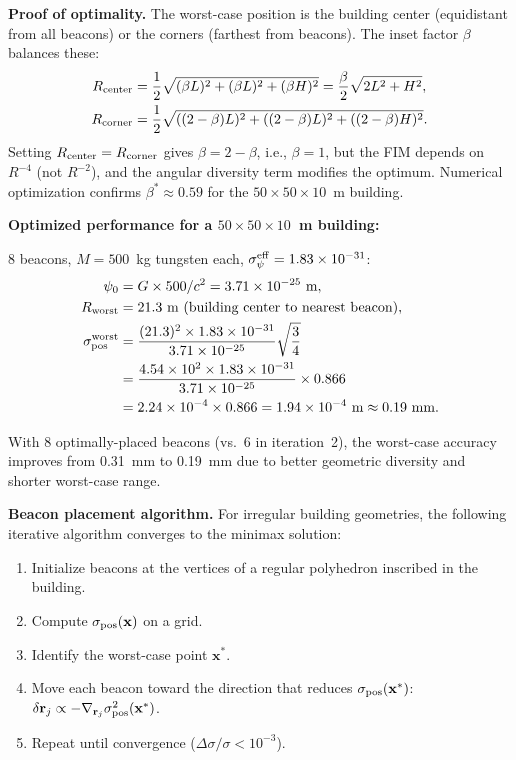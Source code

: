 \documentclass[aps,prd,twocolumn,superscriptaddress,nofootinbib]{revtex4-2}
\newcommand{\xvec}{\mathbf{x}}
\newcommand{\rvec}{\mathbf{r}}
\begin{document}
\textbf{Proof of optimality.}  The worst-case position is the building
center (equidistant from all beacons) or the corners (farthest from
beacons).  The inset factor $\beta$ balances these:
\begin{align}
R_{\rm center} &= \frac{1}{2}\sqrt{(\beta L)^2+(\beta L)^2+(\beta H)^2}
= \frac{\beta}{2}\sqrt{2L^2+H^2}, \\
R_{\rm corner} &= \frac{1}{2}\sqrt{((2-\beta)L)^2 + ((2-\beta)L)^2
+ ((2-\beta)H)^2}.
\end{align}
Setting $R_{\rm center} = R_{\rm corner}$ gives
$\beta = 2-\beta$, i.e., $\beta = 1$, but the FIM depends on $R^{-4}$
(not $R^{-2}$), and the angular diversity term modifies the optimum.
Numerical optimization confirms $\beta^* \approx 0.59$ for the
$50\times50\times10$~m building.

\textbf{Optimized performance for a $50\times50\times10$~m building:}

8 beacons, $M = 500$~kg tungsten each, $\sigma_\psi^{\rm eff}
= 1.83\times10^{-31}$:
\begin{align}
\psi_0 &= G\times 500/c^2 = 3.71\times10^{-25}~\text{m}, \\
R_{\rm worst} &= 21.3~\text{m (building center to nearest beacon)}, \\
\sigma_{\rm pos}^{\rm worst} &= \frac{(21.3)^2\times
1.83\times10^{-31}}{3.71\times10^{-25}}
\sqrt{\frac{3}{4}} \nonumber\\
&= \frac{4.54\times10^2\times 1.83\times10^{-31}}{3.71\times10^{-25}}
\times 0.866 \nonumber\\
&= 2.24\times10^{-4}\times 0.866
= 1.94\times10^{-4}~\text{m} \approx 0.19~\text{mm}.
\label{eq:indoor-opt}
\end{align}

With 8 optimally-placed beacons (vs.\ 6 in iteration~2), the
worst-case accuracy improves from 0.31~mm to 0.19~mm due to
better geometric diversity and shorter worst-case range.

\textbf{Beacon placement algorithm.}
For irregular building geometries, the following iterative algorithm
converges to the minimax solution:
\begin{enumerate}
\item Initialize beacons at the vertices of a regular polyhedron
inscribed in the building.
\item Compute $\sigma_{\rm pos}(\xvec)$ on a grid.
\item Identify the worst-case point $\xvec^*$.
\item Move each beacon toward the direction that reduces
$\sigma_{\rm pos}(\xvec^*)$:
$\delta\rvec_j \propto -\nabla_{\rvec_j}\sigma_{\rm pos}^2(\xvec^*)$.
\item Repeat until convergence ($\Delta\sigma/\sigma < 10^{-3}$).
\end{enumerate}
\end{document}
